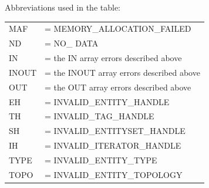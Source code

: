 \documentclass{article}
\begin{document}
Abbreviations used in the table:\\


\begin{tabular}{ll}
MAF  &= MEMORY\_ALLOCATION\_FAILED\\
ND  &= NO\_ DATA\\
IN & = the IN array errors described above\\
INOUT &= the INOUT array errors described above\\
OUT &= the OUT array errors described above\\
EH &= INVALID\_ENTITY\_HANDLE\\
TH &= INVALID\_TAG\_HANDLE\\
SH &= INVALID\_ENTITYSET\_HANDLE\\
IH &= INVALID\_ITERATOR\_HANDLE\\
TYPE &= INVALID\_ENTITY\_TYPE\\
TOPO &= INVALID\_ENTITY\_TOPOLOGY\\
\end{tabular}
\end{document}
